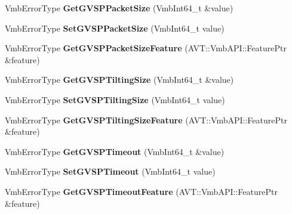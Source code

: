 \begin{DoxyCompactItemize}
\item 
\hypertarget{classMakoCamera_a45d878903b9a37b9722b2f6f4cb11f7d}{Vmb\-Error\-Type {\bfseries Get\-G\-V\-S\-P\-Packet\-Size} (Vmb\-Int64\-\_\-t \&value)}\label{classMakoCamera_a45d878903b9a37b9722b2f6f4cb11f7d}

\item 
\hypertarget{classMakoCamera_a700f4b5886608367cc4ad9970837efbc}{Vmb\-Error\-Type {\bfseries Set\-G\-V\-S\-P\-Packet\-Size} (Vmb\-Int64\-\_\-t value)}\label{classMakoCamera_a700f4b5886608367cc4ad9970837efbc}

\item 
\hypertarget{classMakoCamera_ae5d970ccbb5d494d4227e5ec17487818}{Vmb\-Error\-Type {\bfseries Get\-G\-V\-S\-P\-Packet\-Size\-Feature} (A\-V\-T\-::\-Vmb\-A\-P\-I\-::\-Feature\-Ptr \&feature)}\label{classMakoCamera_ae5d970ccbb5d494d4227e5ec17487818}

\item 
\hypertarget{classMakoCamera_a8d8a9914dcf19b7a43fe62a072229e58}{Vmb\-Error\-Type {\bfseries Get\-G\-V\-S\-P\-Tilting\-Size} (Vmb\-Int64\-\_\-t \&value)}\label{classMakoCamera_a8d8a9914dcf19b7a43fe62a072229e58}

\item 
\hypertarget{classMakoCamera_a54b044999530ac6592283c6217fb3dee}{Vmb\-Error\-Type {\bfseries Set\-G\-V\-S\-P\-Tilting\-Size} (Vmb\-Int64\-\_\-t value)}\label{classMakoCamera_a54b044999530ac6592283c6217fb3dee}

\item 
\hypertarget{classMakoCamera_adaf0578e9f2328ea2cc0215589ff20a0}{Vmb\-Error\-Type {\bfseries Get\-G\-V\-S\-P\-Tilting\-Size\-Feature} (A\-V\-T\-::\-Vmb\-A\-P\-I\-::\-Feature\-Ptr \&feature)}\label{classMakoCamera_adaf0578e9f2328ea2cc0215589ff20a0}

\item 
\hypertarget{classMakoCamera_ae09f2c03e80840c63974ac5e30da3a4c}{Vmb\-Error\-Type {\bfseries Get\-G\-V\-S\-P\-Timeout} (Vmb\-Int64\-\_\-t \&value)}\label{classMakoCamera_ae09f2c03e80840c63974ac5e30da3a4c}

\item 
\hypertarget{classMakoCamera_ac6b575d20a67964f124f0224147d9c7d}{Vmb\-Error\-Type {\bfseries Set\-G\-V\-S\-P\-Timeout} (Vmb\-Int64\-\_\-t value)}\label{classMakoCamera_ac6b575d20a67964f124f0224147d9c7d}

\item 
\hypertarget{classMakoCamera_a25a2362443ca57c3d5a39f1e7eeb328a}{Vmb\-Error\-Type {\bfseries Get\-G\-V\-S\-P\-Timeout\-Feature} (A\-V\-T\-::\-Vmb\-A\-P\-I\-::\-Feature\-Ptr \&feature)}\label{classMakoCamera_a25a2362443ca57c3d5a39f1e7eeb328a}


\end{DoxyCompactItemize}
